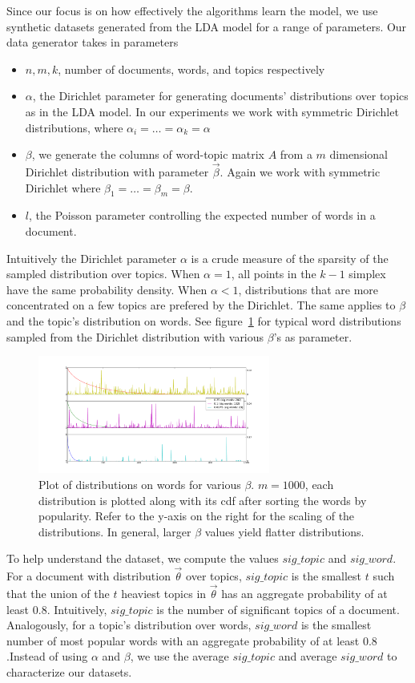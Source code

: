 \documentclass{sig-alternate}
\begin{document}
Since our focus is on how effectively the algorithms learn the model,
we use synthetic datasets generated from the LDA model for a range of
parameters. Our data generator takes in parameters
\begin{itemize}
	\item $n,m,k$, number of documents, words, and topics respectively
	\item $\alpha$, the Dirichlet parameter for generating documents' distributions over topics as in the LDA model. In our experiments we work with symmetric Dirichlet distributions, where $\alpha_i=\ldots=\alpha_k=\alpha$
	\item $\beta$, we generate the columns of word-topic matrix $A$ from a $m$ dimensional Dirichlet distribution with parameter $\vec{\beta}$. Again we work with symmetric Dirichlet where $\beta_1=\ldots=\beta_m=\beta$. 
	\item $l$, the Poisson parameter controlling the expected number of words in a document.
\end{itemize}
Intuitively the Dirichlet parameter $\alpha$ is a crude measure of the
sparsity of the sampled distribution over topics. When $\alpha=1$, all
points in the $k-1$ simplex have the same probability density. When
$\alpha<1$, distributions that are more concentrated on a few topics
are prefered by the Dirichlet. The same applies to $\beta$ and the
topic's distribution on words. See figure~\ref{fig:beta_plots} for
typical word distributions sampled from the Dirichlet distribution
with various $\beta$'s as parameter.  \setlength\tabcolsep{0.5pt}
\begin{figure}
	\includegraphics[width=3in]{beta_plots.pdf}
	\caption{Plot of distributions on words for various $\beta$. $m=1000$, each distribution is plotted along with its cdf after sorting the words by popularity. Refer to the y-axis on the right for the scaling of the distributions. In general, larger $\beta$ values yield flatter distributions.}
	\label{fig:beta_plots}
\end{figure} 
\setlength\tabcolsep{6pt}

To help understand the dataset, we compute the values $sig\_topic$ and
$sig\_word$. For a document with distribution $\vec{\theta}$ over
topics, $sig\_topic$ is the smallest $t$ such that the union of the
$t$ heaviest topics in $\vec{\theta}$ has an aggregate probability of
at least $0.8$. Intuitively, $sig\_topic$ is the number of significant
topics of a document. Analogously, for a topic's distribution over
words, $sig\_word$ is the smallest number of most popular words with
an aggregate probability of at least $0.8$.Instead of using $\alpha$
and $\beta$, we use the average $sig\_topic$ and average $sig\_word$
to characterize our datasets.
\end{document}
